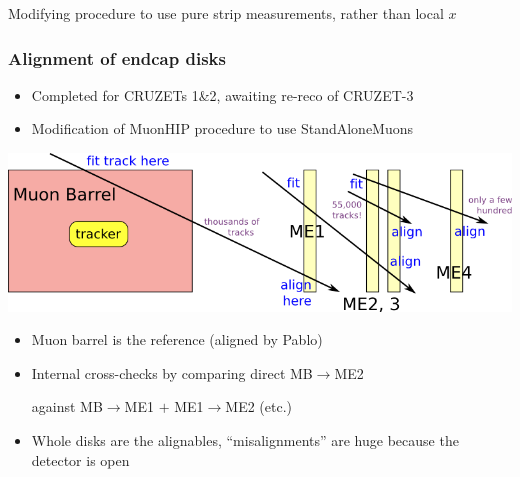\documentclass[compress]{beamer}
\begin{document}
\begin{frame}
\vfill
Modifying procedure to use pure strip measurements, rather than local $x$
\end{frame}

\begin{frame}
\frametitle{Alignment of endcap disks}

\begin{itemize}
\item Completed for CRUZETs 1\&2, awaiting re-reco of CRUZET-3
\item Modification of MuonHIP procedure to use StandAloneMuons
\end{itemize}

\begin{center}
\includegraphics[width=0.9\linewidth]{fit_here_align_there}
\end{center}

\begin{itemize}
\item Muon barrel is the reference (aligned by Pablo)
\item Internal cross-checks by comparing direct MB$\to$ME2

against MB$\to$ME1 $+$ ME1$\to$ME2 (etc.)

\item Whole disks are the alignables, ``misalignments'' are huge because the detector is open
\end{itemize}
\end{frame}
\end{document}
